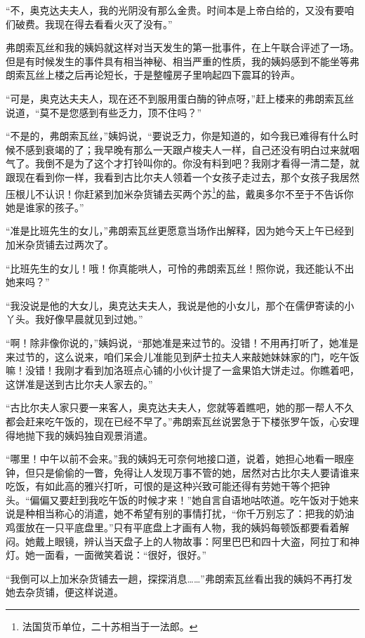 \par “不，奥克达夫夫人，我的光阴没有那么金贵。时间本是上帝白给的，又没有要咱们破费。我现在得去看看火灭了没有。”
\par 弗朗索瓦丝和我的姨妈就这样对当天发生的第一批事件，在上午联合评述了一场。但是有时候发生的事件具有相当神秘、相当严重的性质，我的姨妈感到不能坐等弗朗索瓦丝上楼之后再论短长，于是整幢房子里响起四下震耳的铃声。
\par “可是，奥克达夫夫人，现在还不到服用蛋白酶的钟点呀，”赶上楼来的弗朗索瓦丝说道，“莫不是您感到有些乏力，顶不住吗？”
\par “不是的，弗朗索瓦丝，”姨妈说，“要说乏力，你是知道的，如今我已难得有什么时候不感到衰竭的了；我早晚有那么一天跟卢梭夫人一样，自己还没有明白过来就咽气了。我倒不是为了这个才打铃叫你的。你没有料到吧？我刚才看得一清二楚，就跟现在看到你一样，我看到古比尔夫人领着一个女孩子走过去，那个女孩子我居然压根儿不认识！你赶紧到加米杂货铺去买两个苏\footnote{法国货币单位，二十苏相当于一法郎。}的盐，戴奥多尔不至于不告诉你她是谁家的孩子。”
\par “准是比班先生的女儿，”弗朗索瓦丝更愿意当场作出解释，因为她今天上午已经到加米杂货铺去过两次了。
\par “比班先生的女儿！哦！你真能哄人，可怜的弗朗索瓦丝！照你说，我还能认不出她来吗？”
\par “我没说是他的大女儿，奥克达夫夫人，我说是他的小女儿，那个在儒伊寄读的小丫头。我好像早晨就见到过她。”
\par “啊！除非像你说的，”姨妈说，“那她准是来过节的。没错！不用再打听了，她准是来过节的，这么说来，咱们呆会儿准能见到萨士拉夫人来敲她妹妹家的门，吃午饭嘛！没错！我刚才看到加洛班点心铺的小伙计提了一盒果馅大饼走过。你瞧着吧，这饼准是送到古比尔夫人家去的。”
\par “古比尔夫人家只要一来客人，奥克达夫夫人，您就等着瞧吧，她的那一帮人不久都会赶来吃午饭的，现在已经不早了。”弗朗索瓦丝说罢急于下楼张罗午饭，心安理得地抛下我的姨妈独自观景消遣。
\par “哪里！中午以前不会来。”我的姨妈无可奈何地接口道，说着，她担心地看一眼座钟，但只是偷偷的一瞥，免得让人发现万事不管的她，居然对古比尔夫人要请谁来吃饭，有如此高的雅兴打听，可恨的是这种兴致可能还得有劳她干等个把钟头。“偏偏又要赶到我吃午饭的时候才来！”她自言自语地咕哝道。吃午饭对于她来说是种相当称心的消遣，她不希望有别的事情打扰，“你千万别忘了：把我的奶油鸡蛋放在一只平底盘里。”只有平底盘上才画有人物，我的姨妈每顿饭都要看着解闷。她戴上眼镜，辨认当天盘子上的人物故事：阿里巴巴和四十大盗，阿拉丁和神灯。她一面看，一面微笑着说：“很好，很好。”
\par “我倒可以上加米杂货铺去一趟，探探消息……”弗朗索瓦丝看出我的姨妈不再打发她去杂货铺，便这样说道。

